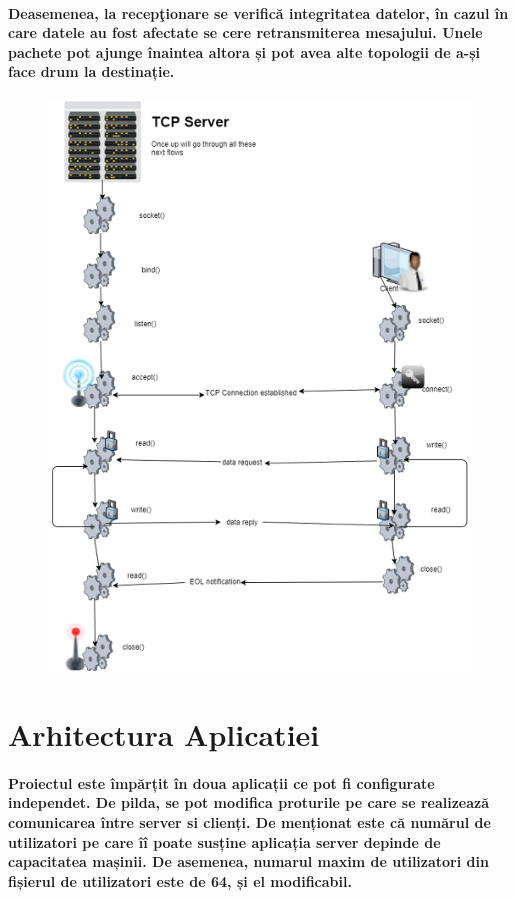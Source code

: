\documentclass{article}
\begin{document}
	\paragraph{
		Deasemenea, la recepţionare se verifică integritatea datelor, în cazul în care datele au fost afectate se cere retransmiterea mesajului.
		Unele pachete pot ajunge înaintea altora și pot avea alte topologii de a-și face drum la destinație.
	}
	\begin{figure}
		\includegraphics{tcpip}
	\end{figure}	
	

	
	\newpage
	\section{Arhitectura Aplicatiei}
	
	\paragraph{
		Proiectul este împărțit în doua aplicații ce pot fi configurate independet. De pilda, se pot modifica proturile pe care se realizează comunicarea între server si clienți. De menționat este că numărul de utilizatori pe care îî poate susține aplicația server depinde de capacitatea mașinii. De asemenea, numarul maxim de utilizatori din fișierul de utilizatori este de 64, și el modificabil.	
	}
\end{document}
